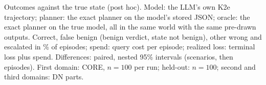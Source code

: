 \begin{table}[!htbp]
\centering
\caption{Outcomes against the true state (post hoc). Model: the LLM's own K2e trajectory; planner: the exact planner on the model's stored JSON; oracle: the exact planner on the true model, all in the same world with the same pre-drawn outputs. Correct, false benign (benign verdict, state not benign), other wrong and escalated in \% of episodes; spend: query cost per episode; realized loss: terminal loss plus spend. Differences: paired, nested 95\% intervals (scenarios, then episodes). First domain: CORE, $n{=}100$ per run; held-out: $n{=}100$; second and third domains: DN parts.}
\label{tab:units}
\scriptsize\setlength{\tabcolsep}{2.5pt}
\resizebox{\linewidth}{!}{}
\end{table}

